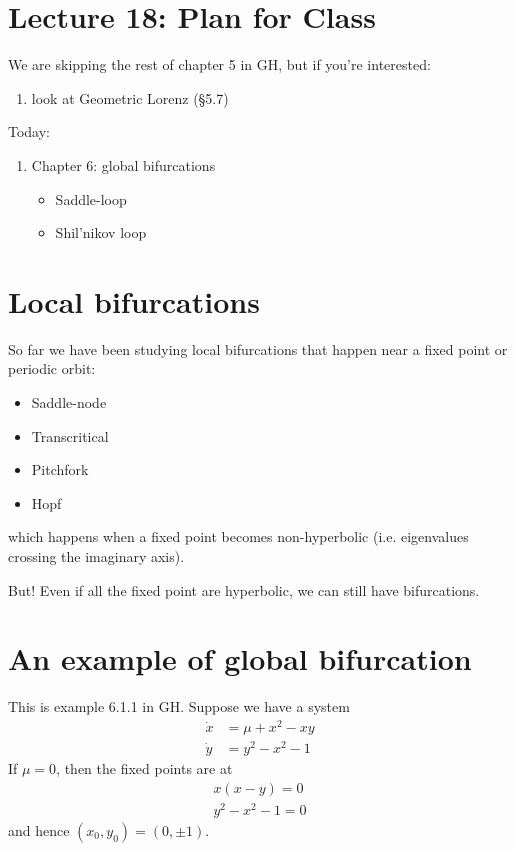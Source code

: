\documentclass{article}
\begin{document}
\section{Lecture 18: Plan for Class}
We are skipping the rest of chapter 5 in GH, but if you're interested:
\begin{enumerate}
    \item look at Geometric Lorenz (\S 5.7)
\end{enumerate}

Today:
\begin{enumerate}
    \item Chapter 6: global bifurcations
    \begin{itemize}
        \item Saddle-loop
        \item Shil'nikov loop
    \end{itemize}
\end{enumerate}

\section{Local bifurcations}

So far we have been studying local bifurcations that happen near a fixed point or periodic orbit:
\begin{itemize}
    \item Saddle-node
    \item Transcritical
    \item Pitchfork
    \item Hopf
\end{itemize}
which happens when a fixed point becomes non-hyperbolic (i.e. eigenvalues crossing the imaginary axis).

But! Even if all the fixed point are hyperbolic, we can still have bifurcations.

\section{An example of global bifurcation}

This is example 6.1.1 in GH. Suppose we have a system
\begin{align*}
    \dot{x}&= \mu +x^2 -xy\\
    \dot{y}&= y^2 - x^2 - 1
\end{align*}
If $\mu=0$, then the fixed points are at 
\begin{gather*}
    x(x-y)=0 \\
    y^2-x^2-1=0
\end{gather*}
and hence $(x_0,y_0)=(0,\pm1)$. 
\end{document}
